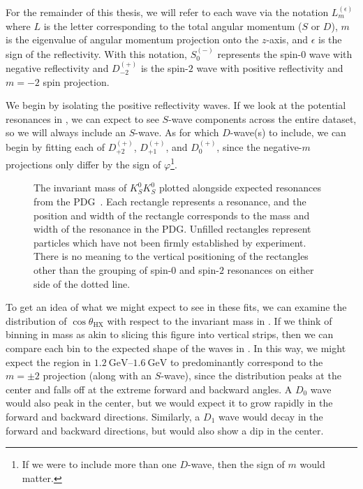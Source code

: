 For the remainder of this thesis, we will refer to each wave via the notation $L_m^{(\epsilon)}$ where $L$ is the letter corresponding to the total angular momentum ($S$ or $D$), $m$ is the eigenvalue of angular momentum projection onto the $z$-axis, and $\epsilon$ is the sign of the reflectivity. With this notation, $S_0^{(-)}$ represents the spin-$0$ wave with negative reflectivity and $D_{-2}^{(+)}$ is the spin-$2$ wave with positive reflectivity and $m=-2$ spin projection.

We begin by isolating the positive reflectivity waves. If we look at the potential resonances in , we can expect to see $S$-wave components across the entire dataset, so we will always include an $S$-wave. As for which $D$-wave(s) to include, we can begin by fitting each of $D_{+2}^{(+)}$, $D_{+1}^{(+)}$, and $D_{0}^{(+)}$, since the negative-$m$ projections only differ by the sign of $\varphi$\footnote{If we were to include more than one $D$-wave, then the sign of $m$ would matter.}.

\begin{figure}
  \begin{center}
    
  \end{center}
  \caption{The invariant mass of $K_S^0K_S^0$ plotted alongside expected resonances from the PDG~\cite{Zyla2020}. Each rectangle represents a resonance, and the position and width of the rectangle corresponds to the mass and width of the resonance in the PDG. Unfilled rectangles represent particles which have not been firmly established by experiment. There is no meaning to the vertical positioning of the rectangles other than the grouping of spin-$0$ and spin-$2$ resonances on either side of the dotted line.}\label{fig:mass-with-pdg}
\end{figure}

To get an idea of what we might expect to see in these fits, we can examine the distribution of $\cos\theta_\text{HX}$ with respect to the invariant mass in . If we think of binning in mass as akin to slicing this figure into vertical strips, then we can compare each bin to the expected shape of the waves in . In this way, we might expect the region in $\qtyrange{1.2}{1.6}{\giga\electronvolt}$ to predominantly correspond to the $m=\pm 2$ projection (along with an $S$-wave), since the distribution peaks at the center and falls off at the extreme forward and backward angles. A $D_0$ wave would also peak in the center, but we would expect it to grow rapidly in the forward and backward directions. Similarly, a $D_1$ wave would decay in the forward and backward directions, but would also show a dip in the center.

